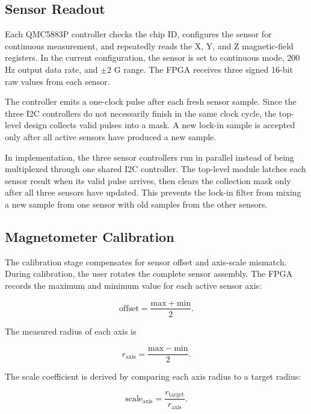 \subsection{Sensor Readout}

Each QMC5883P controller checks the chip ID, configures the sensor for continuous measurement, and repeatedly reads the X, Y, and Z magnetic-field registers. In the current configuration, the sensor is set to continuous mode, 200 Hz output data rate, and $\pm 2$ G range. The FPGA receives three signed 16-bit raw values from each sensor.

The controller emits a one-clock  pulse after each fresh sensor sample. Since the three I2C controllers do not necessarily finish in the same clock cycle, the top-level design collects valid pulses into a mask. A new lock-in sample is accepted only after all active sensors have produced a new sample.

In implementation, the three sensor controllers run in parallel instead of being multiplexed through one shared I2C controller. The top-level  module latches each sensor result when its valid pulse arrives, then clears the collection mask only after all three sensors have updated. This prevents the lock-in filter from mixing a new sample from one sensor with old samples from the other sensors.

\subsection{Magnetometer Calibration}

The calibration stage compensates for sensor offset and axis-scale mismatch. During calibration, the user rotates the complete sensor assembly. The FPGA records the maximum and minimum value for each active sensor axis:

\begin{equation}
    \mathrm{offset} = \frac{\mathrm{max} + \mathrm{min}}{2}.
\end{equation}

The measured radius of each axis is

\begin{equation}
    r_{\mathrm{axis}} = \frac{\mathrm{max} - \mathrm{min}}{2}.
\end{equation}

The scale coefficient is derived by comparing each axis radius to a target radius:

\begin{equation}
    \mathrm{scale}_{\mathrm{axis}} =
    \frac{r_{\mathrm{target}}}{r_{\mathrm{axis}}}.
\end{equation}

